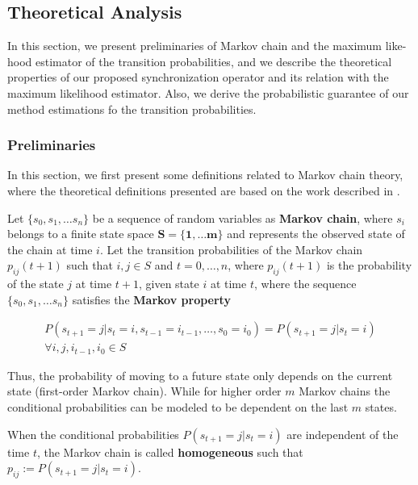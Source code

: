 


\subsection{Theoretical Analysis}
\label{sec:theoretical}
 In this section, we present preliminaries of Markov chain and the maximum like-hood estimator of the transition probabilities, and we describe the theoretical properties of our proposed synchronization operator and its relation with the maximum likelihood estimator. Also, we derive the probabilistic guarantee of our method estimations fo the transition probabilities. 
 
 
 \subsubsection*{Preliminaries}
 In this section, we first present some definitions related to Markov chain theory, 
where the theoretical definitions presented  are based 
on the work described in \cite{bertsekas2002introduction,Billingsley1961,anderson1957statistical,howard2012dynamic}.

\begin{definition}
	Let $\{s_0, s_1, \ldots s_n\}$ be a sequence of random variables as \textbf{Markov chain}, where $s_i$ belongs to a finite state space $\mathbf{S =\{1,\ldots m\}}$ and represents the observed state of the chain at time $i$. Let the transition probabilities of the Markov chain $p_{ij}(t+1)$ such that $i,j \in S$ and $t=0,\ldots, n$, where  $p_{ij}(t+1)$ is the probability of the state $j$ at time $t+1$, given state $i$ at time $t$, where the sequence $\{s_0, s_1, \ldots s_n\}$ satisfies the \textbf{Markov property} 
	
	\begin{equation}
	\begin{aligned}
	P(s_{t+1}=j|s_{t}=i,s_{t-1}=i_{t-1},\ldots ,s_{0}=i_{0})=P(s_{t+1}=j|s_{t}=i)\\
	\forall i,j,i_{t-1},i_{0} \in S
	\end{aligned}
	\end{equation}

	
	Thus, the probability of moving to a future state only depends on the current state (first-order Markov chain). While for higher order $m$ Markov chains the conditional probabilities can be modeled to be dependent on the last $m$ states. 
	
	When the conditional probabilities $P(s_{t+1}=j|s_{t}=i)$ are independent of the time $t$, the Markov chain is called \textbf{homogeneous} such that $p_{ij}:=P(s_{t+1}=j|s_{t}=i)$.
	

\end{definition}


